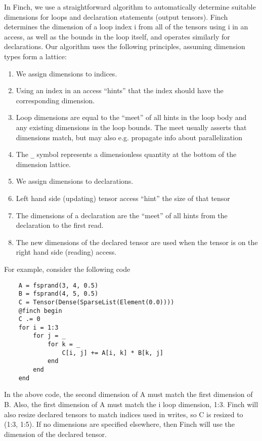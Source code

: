    
    In Finch, we use a straightforward algorithm to automatically determine suitable dimensions for loops and declaration statements (output tensors).
    Finch determines the dimension of a loop index i from all of the tensors using i in an access, as well as the bounds in the loop itself, and operates similarly for declarations.
    Our algorithm uses the following principles, assuming dimension types form a lattice:
    \begin{enumerate}
        \item We assign dimensions to indices.
        \item Using an index in an access “hints” that the index should have the corresponding dimension.
        \item Loop dimensions are equal to the “meet” of all hints in the loop body
        and any existing dimensions in the loop bounds. The meet usually asserts
        that dimensions match, but may also e.g. propagate info about parallelization
        \item The \texttt{_} symbol represents a dimensionless quantity at the bottom of the dimension lattice.
        \item We assign dimensions to declarations.
        \item Left hand side (updating) tensor access “hint” the size of that tensor
        \item The dimensions of a declaration are the “meet” of all hints from
        the declaration to the first read.
        \item The new dimensions of the declared tensor are used when the tensor is on the right hand side (reading)
        access.
    \end{enumerate}

    For example, consider the following code
    
    \begin{verbatim}
    A = fsprand(3, 4, 0.5)
    B = fsprand(4, 5, 0.5)
    C = Tensor(Dense(SparseList(Element(0.0))))
    @finch begin
    C .= 0
    for i = 1:3
        for j = _
            for k = _
                C[i, j] += A[i, k] * B[k, j]
            end
        end
    end
    \end{verbatim}
    
    In the above code, the second dimension of A must match the first dimension of B. Also, the first dimension of A must match the i loop dimension, 1:3. Finch will also resize declared tensors to match indices used in writes, so C is resized to (1:3, 1:5). If no dimensions are specified elsewhere, then Finch will use the dimension of the declared tensor.
    
